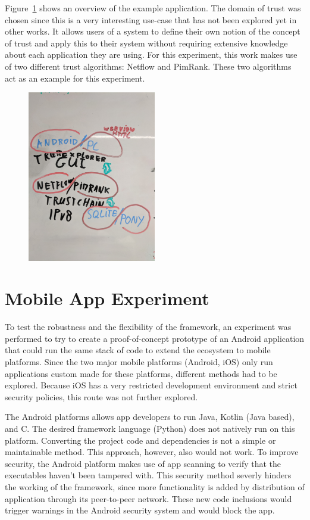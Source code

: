 Figure~\ref{fig:experiment} shows an overview of the example application. The domain of trust was chosen since this is a very interesting use-case that has not been explored yet in other works. It allows users of a system to define their own notion of the concept of trust and apply this to their system without requiring extensive knowledge about each application they are using. For this experiment, this work makes use of two different trust algorithms: Netflow and PimRank. These two algorithms act as an example for this experiment.

\begin{figure}[h]
	\centering
	\includegraphics[width=0.5\textwidth]{images/experiment.jpg}
	\caption{\label{fig:experiment}}
\end{figure}

\section{Mobile App Experiment}

To test the robustness and the flexibility of the framework, an experiment was performed to try to create a proof-of-concept prototype of an Android application that could run the same stack of code to extend the ecosystem to mobile platforms. Since the two major mobile platforms (Android, iOS) only run applications custom made for these platforms, different methods had to be explored. Because iOS has a very restricted development environment and strict security policies, this route was not further explored.

The Android platforms allows app developers to run Java, Kotlin (Java based), and C. The desired framework language (Python) does not natively run on this platform. Converting the project code and dependencies is not a simple or maintainable method. This approach, however, also would not work. To improve security, the Android platform makes use of app scanning to verify that the executables haven't been tampered with. This security method severly hinders the working of the framework, since more functionality is added by distribution of application through its peer-to-peer network. These new code inclusions would trigger warnings in the Android security system and would block the app.

